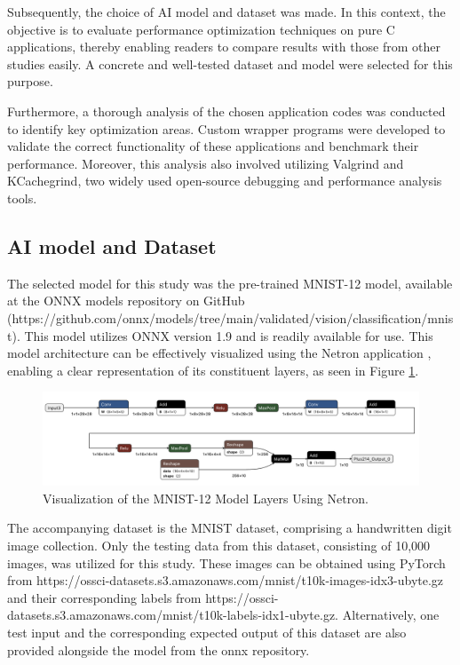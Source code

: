 \documentclass[fleqn,10pt]{olplainarticle}
\begin{document}
Subsequently, the choice of AI model and dataset was made. In this context, the objective is to evaluate performance optimization techniques on pure C applications, thereby enabling readers to compare results with those from other studies easily. A concrete and well-tested dataset and model were selected for this purpose.

Furthermore, a thorough analysis of the chosen application codes was conducted to identify key optimization areas. Custom wrapper programs were developed to validate the correct functionality of these applications and benchmark their performance. Moreover, this analysis also involved utilizing Valgrind and KCachegrind, two widely used open-source debugging and performance analysis tools. 

\subsection{AI model and Dataset}
The selected model for this study was the pre-trained MNIST-12 model, available at the ONNX models repository on GitHub (https://github.com/onnx/models/tree/main/validated/vision/classification/mnist). This model utilizes ONNX version 1.9 and is readily available for use. This model architecture can be effectively visualized using the Netron application \cite{lutzroederNetron2024}, enabling a clear representation of its constituent layers, as seen in Figure \ref{fig:mnist_12_model}.

\begin{figure}[!ht]
    \centering
    \includegraphics[width=\textwidth]{Images/mnist_12_model.png}
    \caption{Visualization of the MNIST-12 Model Layers Using Netron.}
    \label{fig:mnist_12_model}
\end{figure}

The accompanying dataset is the MNIST dataset, comprising a handwritten digit image collection. Only the testing data from this dataset, consisting of 10,000 images, was utilized for this study. These images can be obtained using PyTorch from https://ossci-datasets.s3.amazonaws.com/mnist/t10k-images-idx3-ubyte.gz and their corresponding labels from https://ossci-datasets.s3.amazonaws.com/mnist/t10k-labels-idx1-ubyte.gz. Alternatively, one test input and the corresponding expected output of this dataset are also provided alongside the model from the onnx repository.
\end{document}
